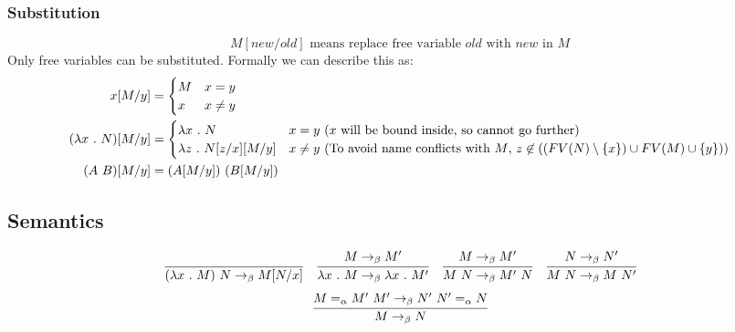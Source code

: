 \documentclass{report}
\begin{document}
\subsubsection*{Substitution}
\[M [new / old] \text{ means replace free variable $old$ with $new$ in $M$}\]
Only free variables can be substituted.
Formally we can describe this as:
\[\begin{split}
		x[M/y] &= \begin{cases}
			M & x = y    \\
			x & x \neq y \\
		\end{cases} \\
		(\lambda x \ . \ N)[M/y] &= \begin{cases}
			\lambda x \ . \ N           & x = y \ \text{($x$ will be bound inside, so cannot go further)}                                                   \\
			\lambda z \ . \ N[z/x][M/y] & x \neq y \ \text{(To avoid name conflicts with $M$, $z \not\in ((FV(N) \setminus \{x\}) \cup FV(M) \cup \{y\})$)}
		\end{cases} \\
		(A \ B)[M/y] &= (A[M/y]) \ (B[M/y]) \\
	\end{split}\]

\subsection*{Semantics}
\[\begin{matrix}
		\cfrac{}{(\lambda x \ . \ M) \ N \to_\beta M[N/x]}         &
		\cfrac{M \to_\beta M'}{\lambda x \ . \ M \to_\beta \lambda x \ . \ M'} &
		\cfrac{M \to_\beta M'}{M \ N \to_\beta M' \ N} &
		\cfrac{N \to_\beta N'}{M \ N \to_\beta M \ N'}   \\
	\end{matrix}
\]
\[\cfrac{M =_\alpha M' \ M' \to_\beta N' \ N' =_\alpha N }{M \to_\beta N}\]
\end{document}
